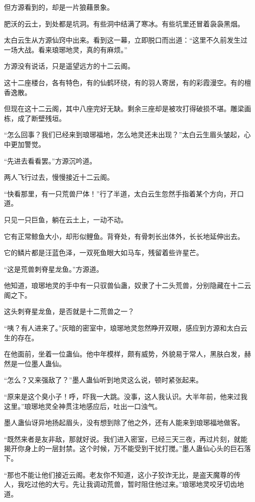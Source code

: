 \begin{this_body}
但方源看到的，却是一片狼藉景象。

肥沃的云土，到处都是坑洞。有些洞中结满了寒冰。有些坑里还冒着袅袅黑烟。

太白云生从方源仙窍中出来。看到这一幕，立即脱口而出道：“这里不久前发生过一场大战。看来琅琊地灵，真的有麻烦。”

方源没有说话，只是遥望远方的十二云阁。

这十二座楼台，各有特色，有的仙鹤环绕，有的羽人寄居，有的彩霞漫空。有的檀香逸散。

但现在这十二云阁，其中八座完好无缺。剩余三座却是被攻打得破损不堪。雕梁画栋，成了断壁残垣。

“怎么回事？我们已经来到琅琊福地，怎么地灵还未出现？”太白云生眉头皱起，心中更加警觉。

“先进去看看罢。”方源沉吟道。

两人飞行过去，慢慢接近十二云阁。

“快看那里，有一只荒兽尸体！”行了半道，太白云生忽然手指着某个方向，开口道。

只见一只巨鱼，躺在云土上，一动不动。

它有正常鲸鱼大小，却形似鲤鱼。背脊处，有骨刺长出体外，长长地延伸出去。

它的鳞片都是汪蓝色泽，一双死鱼眼大如马车，残留着些许星芒。

“这是荒兽刺脊星龙鱼。”方源道。

他知道，琅琊地灵的手中有一只驭兽仙蛊，奴隶了十二头荒兽，分别隐藏在十二云阁之下。

这头刺脊星龙鱼，是否就是十二荒兽之一？

“咦？有人进来了。”灰暗的密室中，琅琊地灵忽然睁开双眼，感应到方源和太白云生的存在。

在他面前，坐着一位蛊仙。他中年模样，颇有威势，外貌易于常人，黑肤白发，赫然是一位墨人蛊仙。

“怎么？又来强敌了？”墨人蛊仙听到地灵这么说，顿时紧张起来。

“原来是这个臭小子！呼，吓我一大跳。没事，这人我认识。大半年前，他来过我这里。”琅琊地灵全神贯注地感应后，吐出一口浊气。

墨人蛊仙讶异地扬起眉头，没有想到除了他之外，还有人能来到琅琊福地做客。

“既然来者是友非敌，那就好说。我们进入密室，已经三天三夜，再过片刻，就能揭开你身上的一层封禁。这个时候，万不能受到干扰打搅。”墨人蛊仙心头的巨石落下。

“那也不能让他们接近云阁。老友你不知道，这小子狡诈无比，是盗天魔尊的传人，我吃过他的大亏。先让我调动荒兽，暂时阻住他过来。”琅琊地灵咬牙切齿地道。


\end{this_body}
